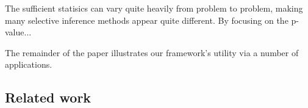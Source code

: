 \documentclass{article}
\begin{document}
The sufficient statisics can vary quite heavily from problem to problem, making many selective inference methods appear quite different. By focusing on the p-value... 

The remainder of the paper illustrates our framework's utility via a number of applications. 





\subsection{Related work}



\end{document}
